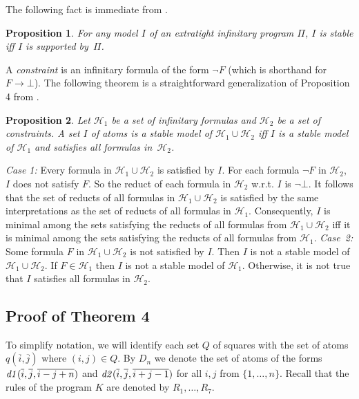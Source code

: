 \documentclass{tlp}
\def\o{\overline}
\def\rar{\rightarrow}
\def\i#1{\hbox{\it #1\/}}
\newtheorem{proposition}{Proposition}
\begin{document}
The following fact is immediate from \cite[Lemma 2]{lif13a}.

\begin{proposition}\label{thm:etight}
For any model $I$ of an extratight infinitary program $\Pi$, $I$ is
stable iff $I$ is supported by~$\Pi$.
\end{proposition}

A {\sl constraint} is an infinitary formula of the form $\neg F$
(which is shorthand for $F\rar\bot$). The
following theorem is a straightforward generalization of
Proposition 4  from \cite{fer05e}.

\begin{proposition}\label{thm:cons}
Let $\mathcal{H}_1$  be a set of infinitary formulas and $\mathcal{H}_2$ be
a set of constraints. A set $I$ of
atoms  is a stable model of $\mathcal{H}_1 \cup \mathcal{H}_2$ iff $I$ is a
stable model of $\mathcal{H}_1$ and satisfies all formulas in~$\mathcal{H}_2$.
\end{proposition}

\begin{proof*}
{\em Case 1:} Every formula in $\mathcal{H}_1 \cup \mathcal{H}_2$ is satisfied
by $I$. For each formula $\neg F$ in $\mathcal{H}_2$, $I$ does not satisfy $F$.
So the reduct of each formula in $\mathcal{H}_2$ w.r.t. $I$ is $\neg \bot$.
It follows that the set of reducts of all formulas in
$\mathcal{H}_1 \cup \mathcal{H}_2$
is satisfied by the same interpretations as the set of reducts of all
formulas in $\mathcal{H}_1$.  Consequently, $I$ is minimal among the sets
satisfying the reducts of all formulas from
$\mathcal{H}_1 \cup \mathcal{H}_2$ iff it is minimal among the sets
satisfying the reducts of all formulas from $\mathcal{H}_1$. {\em Case~2: }
Some formula $F$ in $\mathcal{H}_1 \cup \mathcal{H}_2$ is not satisfied by $I$.
Then $I$ is not a stable model of $\mathcal{H}_1 \cup \mathcal{H}_2$.
If $F \in \mathcal{H}_1$ then $I$ is not a stable model of $\mathcal{H}_1$.
Otherwise, it is not true that $I$ satisfies all formulas in $\mathcal{H}_2$.
\end{proof*}

\subsection*{Proof of Theorem 4}

To simplify notation, we will identify each set $Q$ of squares with the set of
atoms $q(\o i, \o j)$ where \hbox{$(i, j) \in Q$}. By $D_n$ we denote the set
of atoms of the forms $\i{d1}(\o i, \o j, \o{i-j+n})$ and $\i{d2}(\o i, \o j,
\o{i+j-1})$ for all $i,j$ from $\{1,\dots,n\}$. Recall that the rules
of the program $K$ are denoted by $R_1,\dots,R_7$.
\end{document}
